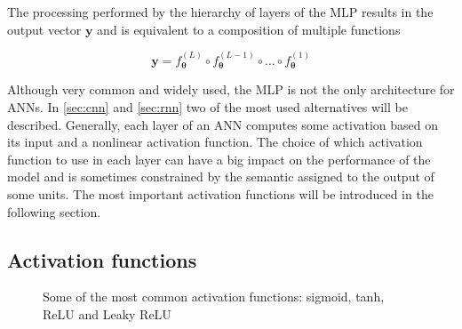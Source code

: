 The processing performed by the hierarchy of layers of the MLP results in the
output vector $\mathbf{y}$ and is equivalent to a composition of multiple
functions

\begin{equation}\label{eq:fn_composition}
    \textbf{y} = f^{(L)}_{\boldsymbol{\theta}} \circ f^{(L-1)}_{\boldsymbol{\theta}} \circ
    \dots \circ f^{(1)}_{\boldsymbol{\theta}}
\end{equation}

Although very common and widely used, the MLP is not the only architecture for
ANNs. In \autoref{sec:cnn} and \autoref{sec:rnn} two of the most used
alternatives will be described. Generally, each layer of an ANN computes some
activation based on its input and a nonlinear activation function. The choice
of which activation function to use in each layer can have a big impact on the
performance of the model and is sometimes constrained by the semantic assigned
to the output of some units. The most important activation functions will be
introduced in the following section.

\subsection{Activation functions}\label{sec:activations}
\begin{figure}[h]
    \centering
    \caption{Some of the most common activation functions: sigmoid, tanh, ReLU
        and Leaky ReLU\label{fig:activations}}
\end{figure}


